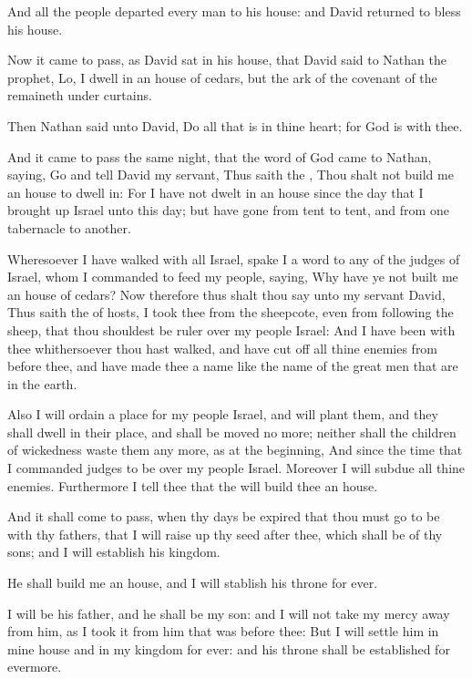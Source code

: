 \Verse And all the people departed every man to his house: and David returned to bless his house.


\Chapter
\Verse Now it came to pass, as David sat in his house, that David said to Nathan the prophet, Lo, I dwell in an house of cedars, but the ark of the covenant of the \LORD remaineth under curtains.

\Verse Then Nathan said unto David, Do all that is in thine heart; for God is with thee.

\Verse And it came to pass the same night, that the word of God came to Nathan, saying, \Verse Go and tell David my servant, Thus saith the \LORD, Thou shalt not build me an house to dwell in: \Verse For I have not dwelt in an house since the day that I brought up Israel unto this day; but have gone from tent to tent, and from one tabernacle to another.

\Verse Wheresoever I have walked with all Israel, spake I a word to any of the judges of Israel, whom I commanded to feed my people, saying, Why have ye not built me an house of cedars?  \Verse Now therefore thus shalt thou say unto my servant David, Thus saith the \LORD of hosts, I took thee from the sheepcote, even from following the sheep, that thou shouldest be ruler over my people Israel: \Verse And I have been with thee whithersoever thou hast walked, and have cut off all thine enemies from before thee, and have made thee a name like the name of the great men that are in the earth.

\Verse Also I will ordain a place for my people Israel, and will plant them, and they shall dwell in their place, and shall be moved no more; neither shall the children of wickedness waste them any more, as at the beginning, \Verse And since the time that I commanded judges to be over my people Israel. Moreover I will subdue all thine enemies.  Furthermore I tell thee that the \LORD will build thee an house.

\Verse And it shall come to pass, when thy days be expired that thou must go to be with thy fathers, that I will raise up thy seed after thee, which shall be of thy sons; and I will establish his kingdom.

\Verse He shall build me an house, and I will stablish his throne for ever.

\Verse I will be his father, and he shall be my son: and I will not take my mercy away from him, as I took it from him that was before thee: \Verse But I will settle him in mine house and in my kingdom for ever: and his throne shall be established for evermore.

